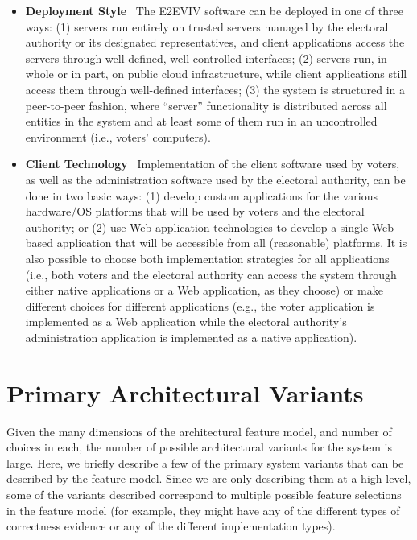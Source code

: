 \begin{itemize}
\item \textbf{Deployment Style} \ The E2EVIV software can be deployed
  in one of three ways: (1) servers run entirely on trusted servers
  managed by the electoral authority or its designated
  representatives, and client applications access the servers through
  well-defined, well-controlled interfaces; (2) servers run, in whole
  or in part, on public cloud infrastructure, while client applications
  still access them through well-defined interfaces; (3) the system is
  structured in a peer-to-peer fashion, where ``server'' functionality
  is distributed across all entities in the system and at least some
  of them run in an uncontrolled environment (i.e., voters'
  computers). 

\item \textbf{Client Technology} \ Implementation of the client
  software used by voters, as well as the administration software used
  by the electoral authority, can be done in two basic ways: (1)
  develop custom applications for the various hardware/OS platforms
  that will be used by voters and the electoral authority; or (2) use
  Web application technologies to develop a single Web-based
  application that will be accessible from all (reasonable)
  platforms. It is also possible to choose both implementation
  strategies for all applications (i.e., both voters and the electoral
  authority can access the system through either native applications
  or a Web application, as they choose) or make different choices for
  different applications (e.g., the voter application is implemented
  as a Web application while the electoral authority's administration
  application is implemented as a native application).

\end{itemize}

\section{Primary Architectural Variants}

Given the many dimensions of the architectural feature model, and
number of choices in each, the number of possible architectural
variants for the system is large. Here, we briefly describe a few of
the primary system variants that can be described by the feature
model. Since we are only describing them at a high level, some of the
variants described correspond to multiple possible feature selections
in the feature model (for example, they might have any of the
different types of correctness evidence or any of the different
implementation types).

